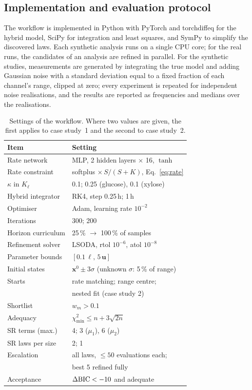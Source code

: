 \subsection{Implementation and evaluation protocol}\label{sec:m:impl}
The workflow is implemented in Python with PyTorch \citep{Paszke2019} and torchdiffeq \citep{Chen2018} for the hybrid model, SciPy \citep{Virtanen2020} for integration and least squares, and SymPy \citep{Meurer2017} to simplify the discovered laws. Each synthetic analysis runs on a single CPU core; for the real runs, the candidates of an analysis are refined in parallel. For the synthetic studies, measurements are generated by integrating the true model and adding Gaussian noise with a standard deviation equal to a fixed fraction of each channel's range, clipped at zero; every experiment is repeated for \ConeSeeds{} independent noise realisations, and the results are reported as frequencies and medians over the realisations.

\begin{table}[width=\linewidth,cols=3,pos=t]
\caption{Settings of the workflow. Where two values are given, the first applies to case study~1 and the second to case study~2.}\label{tab:settings}
\begin{tabular*}{\tblwidth}{@{}LL@{}}
\toprule
Item & Setting \\
\midrule
Rate network & MLP, 2 hidden layers $\times$ 16, $\tanh$ \\
Rate constraint & softplus $\times\, S/(S+K)$, Eq.~\eqref{eq:rate} \\
$\kappa$ in $K_\ell$ & 0.1; 0.25 (glucose), 0.1 (xylose) \\
Hybrid integrator & RK4, step 0.25\,h; 1\,h \\
Optimiser & Adam, learning rate $10^{-2}$ \\
Iterations & 300; 200 \\
Horizon curriculum & 25\,\% $\to$ 100\,\% of samples \\
Refinement solver & LSODA, rtol $10^{-6}$, atol $10^{-8}$ \\
Parameter bounds & $[0.1\,\boldsymbol{\ell},\,5\,\mathbf{u}]$ \\
Initial states & $\mathbf{x}^0 \pm 3\sigma$ (unknown $\sigma$: 5\,\% of range) \\
Starts & rate matching; range centre; \\
 & nested fit (case study 2) \\
Shortlist & $w_m > 0.1$ \\
Adequacy & $\chi^2_{\min}\le n+3\sqrt{2n}$ \\
SR terms (max.) & 4; 3 ($\mu_1$), 6 ($\mu_2$) \\
SR laws per size & 2; 1 \\
Escalation & all laws, $\le 50$ evaluations each; \\
 & best 5 refined fully \\
Acceptance & $\Delta\mathrm{BIC}<-10$ and adequate \\
\bottomrule
\end{tabular*}
\end{table}
